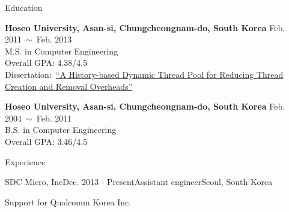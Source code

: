 \documentclass{resume} %
\begin{document}

\begin{rSection}{Education}

{\bf Hoseo University, Asan-si, Chungcheongnam-do, South Korea} \hfill Feb. 2011~$\sim$~Feb. 2013 \\
M.S. in Computer Engineering \\
Overall GPA: 4.38/4.5 \\
Dissertation:~\href{http://dlibrary.hoseo.ac.kr/search/searchDetail.do?rec_key=SH1_000000950591}
{\footnotesize ``A History-based Dynamic Thread Pool for Reducing Thread Creation and Removal Overheads''}

{\bf Hoseo University, Asan-si, Chungcheongnam-do, South Korea} \hfill Feb. 2004~$\sim$~Feb. 2011 \\
B.S. in Computer Engineering \\
Overall GPA: 3.46/4.5

\end{rSection}


\begin{rSection}{Experience}



  \begin{rSubsection}{SDC Micro, Inc}{Dec. 2013 - Present}{Assistant engineer}{Seoul, South Korea}
  \item Support for Qualcomm Korea Inc. \\
  \end{rSubsection}

\end{rSection}

\end{document}
